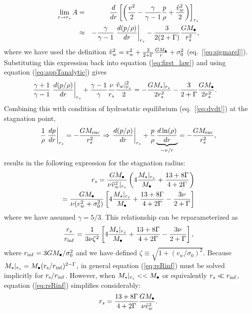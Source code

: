 \begin{align}
  \lim_{r \rightarrow r_s} A &=& \frac{d}{dr} \left[\left(\frac{v^2}{2} -\frac{\gamma}{\gamma-1} \frac{p}{\rho}+\frac{\tilde{v}_{w}^2}{2}\right)\right]_{r_s} \nonumber \\
&\approx& -\frac{\gamma}{\gamma-1}
\left.\frac{d (p/\rho)}{d r}\right|_{r_s}-\frac{3}{2(2+\Gamma)} \frac{G M_{\bullet}}{r_s^2},
\end{align}
where we have used the definition $\tilde{v}_{w}^2=v_{w}^2+ \frac{3}{2+\Gamma} \frac{G M_{\bullet}}{r} +
\sigma_0^2$ (eq.~[\ref{eq:sigmarel}]).  Substituting this expression back into equation (\ref{eq:first_law}) and using equation (\ref{eq:appTanalytic}) gives
\begin{align}
&\frac{\gamma+1}{\gamma-1}
\left.\frac{d (p/\rho)}{d r}\right|_{r_s}+ \frac{\gamma-1}{\gamma} \frac{\nu}{r_s} \frac{\tilde{v}_{w}|_{r_s}^{2}}{2} = -\frac{G
  M_{\star}|_{r_s}}{2 r_s^2} -\frac{3}{2+\Gamma} \frac{G M_{\bullet}}{2 r_s^2}.  \label{eq:rs1}
\end{align}
Combining this with condition of hydrostatic equilibrium (eq.~[\ref{eq:dvdt}]) at the stagnation point,
\begin{align}
\frac{1}{\rho}\left.\frac{d p}{d r}\right|_{r_s}=- \frac{GM_{\rm enc}}{r_s^2} \Rightarrow
\left.\frac{d (p/\rho)}{d r}\right|_{r_s} +\frac{p}{\rho}
\underbrace{\frac{d\ln(\rho)}{dr}}_{-\nu/r} = -\frac{G M_{\rm enc}}{r_s^2}, \label{eq:HSE}
\end{align}
results in the following expression for the stagnation radius:
\begin{align}
r_s=\frac{G M_{\bullet}}{\nu \tilde{v}_{w}^{2}|_{r_s}}\left(4
  \frac{M_{\star}|_{r_s}}{M_{\bullet}} +\frac{13+ 8\Gamma}{4+2\Gamma}\right) \nonumber \\
=\frac{G M_{\bullet}}{\nu (v_w^{2}+\sigma_0^2)}\left[4
    \frac{M_{\star}|_{r_s}}{M_{\bullet}} +\frac{13+ 8\Gamma}{4+2\Gamma}-\frac{3\nu }{2+\Gamma}\right]
\label{eq:rs2main}
\end{align}
where we have assumed $\gamma=5/3$.  This relationship can be reparameterized as
\begin{align}
  \frac{r_s}{r_{\rm inf}}=\frac{1}{3\nu \zeta^2} \left[4\frac{M_{\star}|_{r_s}}{M_{\bullet}} +\frac{13+8\Gamma}{4+2\Gamma}- \frac{3\nu }{2+\Gamma}\right],
  \label{eq:rsRinf}
\end{align}
where $r_{\rm inf}=3 G M_{\bullet}/\sigma_0^2$ and we have defined $\zeta \equiv \sqrt{1 + (v_w/\sigma_0)^2}$.  Because $M_{\star}|_{r_s} = M_{\bullet}(r_{\rm s}/r_{\rm inf})^{2-\Gamma}$, in general equation (\ref{eq:rsRinf}) must be solved implicitly for $r_{\rm s}/r_{\rm inf}$.  However, when $M_{\star}|_{r_s} << M_{\bullet}$ or equivalently $r_s \ll r_{\rm inf}$, equation (\ref{eq:rsRinf}) simplifies considerably:
\begin{align}
r_s=\frac{13+8\Gamma}{4+2\Gamma} \frac{G M_{\bullet}}{\nu \tilde{v}_{w}^2}.
\end{align}
